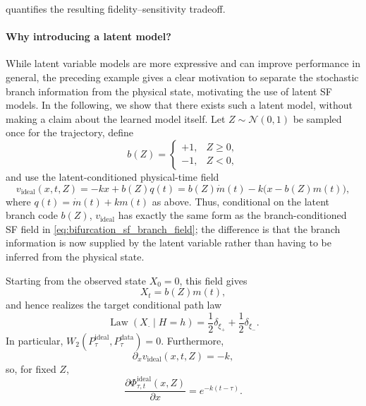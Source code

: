  quantifies the resulting
fidelity--sensitivity tradeoff.

\paragraph{Why introducing a latent model?} While latent variable models are more expressive and can improve performance in general,
the preceding example gives a clear motivation to separate the stochastic branch
information from the physical state, motivating the use of latent SF models.
In the following, we show that there exists such a latent model, without making
a claim about the learned model itself. 
Let $Z\sim\mathcal N(0,1)$ be sampled once for the
trajectory, define
\begin{equation}
b(Z)
=
\begin{cases}
+1, & Z\geq0,\\
-1, & Z<0,
\end{cases}
\label{eq:bifurcation_ideal_branch_code}
\end{equation}
and use the latent-conditioned physical-time field
\begin{equation}
v_{\mathrm{ideal}}(x,t,Z)
=
-kx+b(Z)q(t)
=
b(Z)\dot m(t)
-
k\bigl(x-b(Z)m(t)\bigr),
\label{eq:bifurcation_ideal_field}
\end{equation}
where $q(t)=\dot m(t)+km(t)$ as above.
Thus, conditional on the latent branch code $b(Z)$,
$v_{\mathrm{ideal}}$ has exactly the same form as the branch-conditioned
SF field in \eqref{eq:bifurcation_sf_branch_field}; the difference is that
the branch information is now supplied by the latent variable rather than
having to be inferred from the physical state.

Starting from the  observed state $X_0=0$, this field gives
\begin{equation}
X_t=b(Z)m(t),
\label{eq:bifurcation_ideal_path}
\end{equation}
and hence realizes the target conditional path law
\begin{equation}
\operatorname{Law}(X_\cdot\mid H=h)
=
\frac12\delta_{\xi_+}
+
\frac12\delta_{\xi_-}.
\label{eq:bifurcation_ideal_path_law}
\end{equation}
In particular,
$W_2\left(
P_{\tau}^{\mathrm{ideal}},
P_{\tau}^{\mathrm{data}}
\right)
=0.$
Furthermore,
\begin{equation}
\partial_xv_{\mathrm{ideal}}(x,t,Z)=-k,
\end{equation}
so, for fixed $Z$,
\begin{equation}
\frac{\partial
\Phi_{\tau,t}^{\mathrm{ideal}}(x,Z)}
{\partial x}
=
e^{-k(t-\tau)}.
\label{eq:bifurcation_ideal_sensitivity}
\end{equation}

